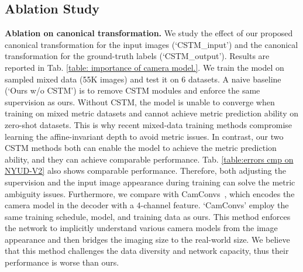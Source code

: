 \subsection{Ablation Study}
\noindent\textbf{Ablation on canonical transformation.}
We study the effect of our proposed canonical transformation for the input images (`CSTM\_input') and the canonical transformation for the ground-truth labels (`CSTM\_output'). Results are reported in  Tab. \ref{table: importance of camera model.}. We train the model on sampled mixed data (55K images) and test it on 6 datasets. A naive baseline (`Ours w/o CSTM') is to remove CSTM modules and enforce the same supervision as ours. Without CSTM, the model is unable to converge when training on mixed metric datasets and cannot achieve metric prediction ability on zero-shot datasets. This is why recent mixed-data training methods compromise learning the affine-invariant depth to avoid metric issues. In contrast, our two CSTM methods both can enable the model to achieve the metric prediction ability, and they can achieve comparable performance. Tab. \ref{table:errors cmp on NYUD-V2} also shows comparable performance. Therefore, both adjusting the supervision and the input image appearance during training can solve the metric ambiguity issues. Furthermore, we compare with CamConvs~\cite{facil2019cam}, which encodes the camera model in the decoder with a 4-channel feature. `CamConvs' employ the same training schedule, model, and training data as ours. This method enforces the network to implicitly understand various camera models from the image appearance and then bridges the imaging size to the real-world size. We believe that this method challenges the data diversity and network capacity, thus their performance is worse than ours. 


\begin{table}[]
\caption{Effectiveness of our CSTM. CamConvs~\cite{facil2019cam} directly encodes various camera models in the network, while we perform a simple yet effective transformation to solve the metric ambiguity. Without CSTM, the model cannot achieve transferable metric prediction ability.}
\vspace{-1 em}
\label{table: importance of camera model.}
\vspace{-1 em}
\end{table}





